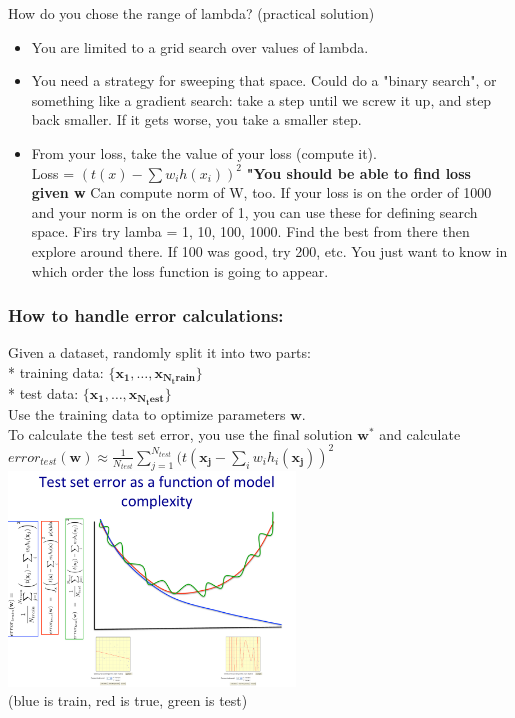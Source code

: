 How do you chose the range of lambda? (practical solution) 
\begin{itemize}
	\item You are limited to a grid search over values of lambda. 
	\item You need a strategy for sweeping that space.   
		Could do a "binary search", or something like a gradient search: 
		take a step until we screw it up, and step back smaller.   
		If it gets worse, you take a smaller step.
	\item From your loss, take the value of your loss (compute it).  \hfill \\
		Loss = $(t(x) - \sum w_i h(x_i))^2$  
        		\textbf{"You should be able to find loss given w}
            	Can compute norm of W, too.  
		If your loss is on the order of 1000 and your norm is on the order of 1, you can use these for defining search space.
                	Firs try lamba = 1, 10, 100, 1000.  
		Find the best from there then explore around there.
		If 100 was good, try 200, etc.   
		You just want to know in which order the loss function is going to appear. 
\end{itemize}

\subsubsection{How to handle error calculations:}
Given a dataset, randomly split it into two parts:  \hfill \\
* training data: $\{ \bm{x_1}, \dots, \bm{x_{N_train}} \}$   \hfill \\
* test data: $\{ \bm{x_1}, \dots, \bm{x_{N_test}} \}$   \hfill \\
Use the training data to optimize parameters $\bm{w}$. \hfill \\
To calculate the test set error, you use the final solution $\bm{w^*}$ and calculate \hfill \\
$\displaystyle error_{test}(\bm{w}) \approx \frac{1}{N_{test}} \sum_{j=1}^{N_{test}} (t(\bm{x_j} - \sum_i w_i h_i(\bm{x_j}))^2$  \hfill \\

\includegraphics[width=3in]{figures/errors_as_f_of_complexity.pdf}   \hfill \\
(blue is train, red is true, green is test) \hfill \\

